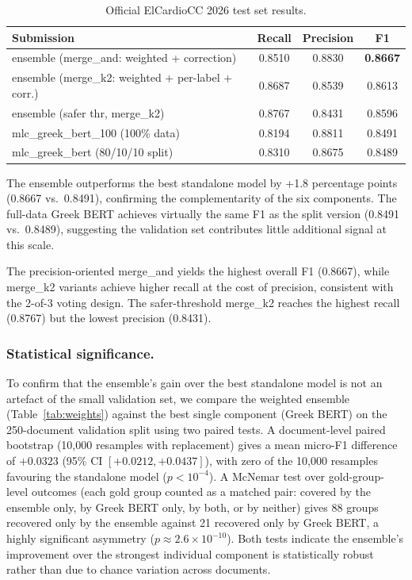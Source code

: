 \begin{table}[h]
\centering
\caption{Official ElCardioCC 2026 test set results.}
\label{tab:results}
\begin{tabular}{lccc}
\toprule
Submission & Recall & Precision & F1 \\
\midrule
ensemble (merge\_and: weighted + correction)       & 0.8510 & 0.8830 & \textbf{0.8667} \\
ensemble (merge\_k2: weighted + per-label + corr.) & 0.8687 & 0.8539 & 0.8613 \\
ensemble (safer thr, merge\_k2)                    & 0.8767 & 0.8431 & 0.8596 \\
mlc\_greek\_bert\_100 (100\% data)                 & 0.8194 & 0.8811 & 0.8491 \\
mlc\_greek\_bert (80/10/10 split)                  & 0.8310 & 0.8675 & 0.8489 \\
\bottomrule
\end{tabular}
\end{table}

The ensemble outperforms the best standalone model by +1.8 percentage points (0.8667 vs.\ 0.8491),
confirming the complementarity of the six components. The full-data Greek BERT achieves
virtually the same F1 as the split version (0.8491 vs.\ 0.8489), suggesting the
validation set contributes little additional signal at this scale.

The precision-oriented merge\_and yields the highest overall F1 (0.8667), while
merge\_k2 variants achieve higher recall at the cost of precision, consistent with the
2-of-3 voting design. The safer-threshold merge\_k2 reaches the highest recall (0.8767)
but the lowest precision (0.8431).

\subsubsection{Statistical significance.}
To confirm that the ensemble's gain over the best standalone model is not an artefact
of the small validation set, we compare the weighted ensemble (Table~\ref{tab:weights})
against the best single component (Greek BERT) on the 250-document validation split
using two paired tests. A document-level paired bootstrap (10,000 resamples with
replacement) gives a mean micro-F1 difference of $+0.0323$ (95\% CI $[+0.0212,
+0.0437]$), with zero of the 10,000 resamples favouring the standalone model
($p<10^{-4}$). A McNemar test over gold-group-level outcomes (each gold group counted
as a matched pair: covered by the ensemble only, by Greek BERT only, by both, or by
neither) gives 88 groups recovered only by the ensemble against 21 recovered only by
Greek BERT, a highly significant asymmetry ($p\approx2.6\times10^{-10}$). Both tests
indicate the ensemble's improvement over the strongest individual component is
statistically robust rather than due to chance variation across documents.

